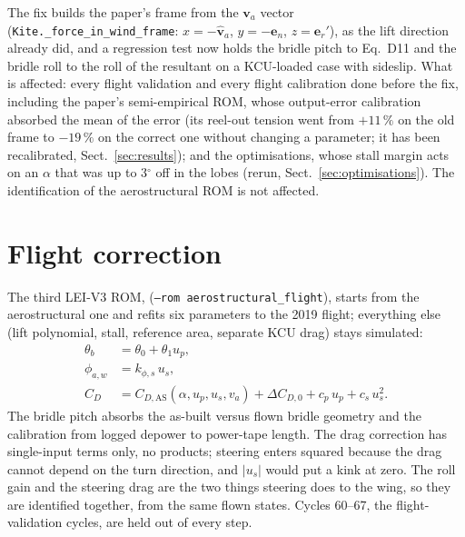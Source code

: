 \documentclass[11pt,a4paper]{article}
\newcommand{\code}[1]{\texttt{\small #1}}
\begin{document}
The fix builds the paper's frame from the $\mathbf v_a$ vector
(\code{Kite.\_force\_in\_wind\_frame}: $x=-\hat{\mathbf v}_a$,
$y=-\mathbf e_n$, $z=\mathbf e_r'$), as the lift direction already did, and
a regression test now holds the bridle pitch to Eq.~D11 and the bridle roll
to the roll of the resultant on a KCU-loaded case with sideslip. What is
affected: every flight validation and every flight calibration done before
the fix, including the paper's semi-empirical ROM, whose output-error
calibration absorbed the mean of the error (its reel-out tension went from
$+11\,\%$ on the old frame to $-19\,\%$ on the correct one without changing
a parameter; it has been recalibrated, Sect.~\ref{sec:results}); and the
optimisations, whose stall margin acts on an $\alpha$ that was up to
3$^\circ$ off in the lobes (rerun, Sect.~\ref{sec:optimisations}). The
identification of the aerostructural ROM is not affected.

\section{Flight correction}
\label{sec:flight-correction}
The third LEI-V3 ROM, 
(\code{--rom aerostructural\_flight}), starts from the aerostructural one and
refits six parameters to the 2019 flight; everything else (lift polynomial,
stall, reference area, separate KCU drag) stays simulated:
\begin{align}
  \theta_b &= \theta_0 + \theta_1 u_p, \\
  \phi_{a,w} &= k_{\phi,s}\, u_s, \\
  C_D &= C_{D,\mathrm{AS}}(\alpha, u_p, u_s, v_a)
         + \Delta C_{D,0} + c_p\, u_p + c_s\, u_s^2 .
\end{align}
The bridle pitch absorbs the as-built versus flown bridle geometry and the
calibration from logged depower to power-tape length. The drag correction has
single-input terms only, no products; steering enters squared because the drag
cannot depend on the turn direction, and $|u_s|$ would put a kink at zero.
The roll gain and the steering drag are the two things steering does to the
wing, so they are identified together, from the same flown states.
Cycles 60--67, the flight-validation cycles, are held out of every step.
\end{document}
